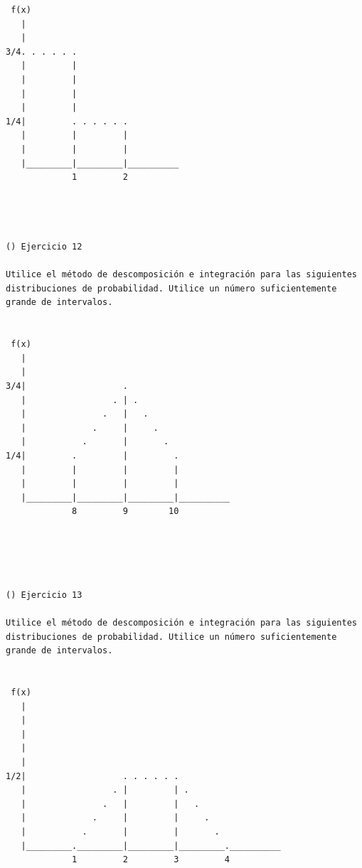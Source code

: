 \begin{verbatim}
 f(x)
   |
   |
3/4. . . . . .
   |         |
   |         |
   |         |
   |         |
1/4|         . . . . . .
   |         |         |
   |         |         |
   |_________|_________|__________
             1         2




() Ejercicio 12

Utilice el método de descomposición e integración para las siguientes distribuciones de probabilidad. Utilice un número suficientemente grande de intervalos.


 f(x)
   |
   |
3/4|                   .
   |                 . | .
   |               .   |   .
   |             .     |     .
   |           .       |       .
1/4|         .         |         .
   |         |         |         |
   |         |         |         |
   |_________|_________|_________|__________
             8         9        10





() Ejercicio 13

Utilice el método de descomposición e integración para las siguientes distribuciones de probabilidad. Utilice un número suficientemente grande de intervalos.


 f(x)
   |
   |
   |
   |
   |
1/2|                   . . . . . .
   |                 . |         | .
   |               .   |         |   .
   |             .     |         |     .
   |           .       |         |       .
   |_________._________|_________|_________.__________
             1         2         3         4



\end{verbatim}